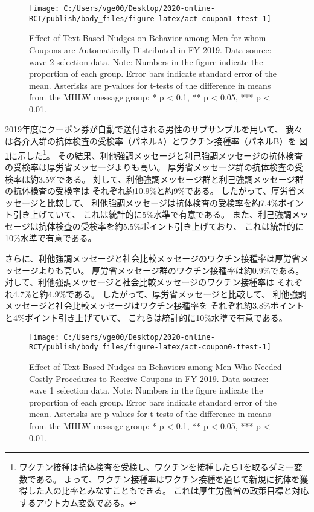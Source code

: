 \documentclass[
  11pt,
  a4paper,
]{article}
\begin{document}
\begin{figure}[t]
\texttt{[image: C:/Users/vge00/Desktop/2020-online-RCT/publish/body\_files/figure-latex/act-coupon1-ttest-1]} \caption{Effect of Text-Based Nudges on Behavior among Men for whom Coupons are Automatically Distributed in FY 2019. Data source: wave 2 selection data. Note: Numbers in the figure indicate the proportion of each group. Error bars indicate standard error of the mean. Asterisks are p-values for t-tests of the difference in means from the MHLW message group: * p < 0.1, ** p < 0.05, *** p < 0.01.}\label{fig:act-coupon1-ttest}
\end{figure}

2019年度にクーポン券が自動で送付される男性のサブサンプルを用いて、
我々は各介入群の抗体検査の受検率（パネルA）とワクチン接種率（パネルB）を
図\ref{fig:act-coupon1-ttest}に示した\footnote{ワクチン接種は抗体検査を受検し、ワクチンを接種したら1を取るダミー変数である。
  よって、ワクチン接種率はワクチン接種を通じて新規に抗体を獲得した人の比率とみなすこともできる。
  これは厚生労働省の政策目標と対応するアウトカム変数である。}。
その結果、利他強調メッセージと利己強調メッセージの抗体検査の受検率は厚労省メッセージよりも高い。
厚労省メッセージ群の抗体検査の受検率は約3.5\%である。
対して、利他強調メッセージ群と利己強調メッセージ群の抗体検査の受検率は
それぞれ約10.9\%と約9\%である。
したがって、厚労省メッセージと比較して、
利他強調メッセージは抗体検査の受検率を約7.4\%ポイント引き上げていて、
これは統計的に5\%水準で有意である。
また、利己強調メッセージは抗体検査の受検率を約5.5\%ポイント引き上げており、
これは統計的に10\%水準で有意である。

さらに、利他強調メッセージと社会比較メッセージのワクチン接種率は厚労省メッセージよりも高い。
厚労省メッセージ群のワクチン接種率は約0.9\%である。
対して、利他強調メッセージと社会比較メッセージのワクチン接種率は
それぞれ4.7\%と約4.9\%である。
したがって、厚労省メッセージと比較して、
利他強調メッセージと社会比較メッセージはワクチン接種率を
それぞれ約3.8\%ポイントと4\%ポイント引き上げていて、
これらは統計的に10\%水準で有意である。

\begin{figure}[t]
\texttt{[image: C:/Users/vge00/Desktop/2020-online-RCT/publish/body\_files/figure-latex/act-coupon0-ttest-1]} \caption{Effect of Text-Based Nudges on Behaviors among Men Who Needed Costly Procedures to Receive Coupons in FY 2019. Data source: wave 1 selection data. Note: Numbers in the figure indicate the proportion of each group. Error bars indicate standard error of the mean. Asterisks are p-values for t-tests of the difference in means from the MHLW message group: * p < 0.1, ** p < 0.05, *** p < 0.01.}\label{fig:act-coupon0-ttest}
\end{figure}
\end{document}
